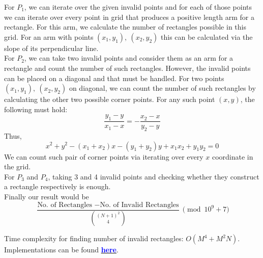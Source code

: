 \documentclass{article}
\begin{document}
For $P_1$, we can iterate over the given invalid points and for each of those points we can iterate over every point in grid that produces a positive length arm for a rectangle. For this arm, we calculate the number of rectangles possible in this grid. For an arm with points $(x_1, y_1), ~(x_2, y_2)$ this can be calculated via the slope of its perpendicular line. \\

For $P_2$, we can take two invalid points and consider them as an arm for a rectangle and count the number of such rectangles. However, the invalid points can be placed on a diagonal and that must be handled. For two points $(x_1, y_1), ~(x_2, y_2)$ on diagonal, we can count the number of such rectangles by calculating the other two possible corner points. For any such point $(x, y)$, the following must hold:
\begin{equation}
    \frac{y_1 - y}{x_1 - x} = - \frac{x_2 - x}{y_2 - y}
\end{equation}
Thus, 
\begin{equation}
    x^2 + y^2 - (x_1 + x_2) x - (y_1 + y_2) y + x_1 x_2 + y_1 y_2 = 0
\end{equation}
We can count such pair of corner points via iterating over every $x$ coordinate in the grid. \\

For $P_3$ and $P_4$, taking 3 and 4 invalid points and checking whether they construct a rectangle respectively is enough.\\

Finally our result would be
\begin{equation}
    \frac{\text{No. of Rectangles } - \text{No. of Invalid Rectangles}}{\binom{(N+1)^2}{4}} \pmod {10^9 + 7}
\end{equation}

Time complexity for finding number of invalid rectangles: $O(M^4 + M^2 N)$.\\

Implementations can be found \href{https://ideone.com/0T4LBS}{\textcolor{blue}{\textbf{here}}}.
\end{document}
